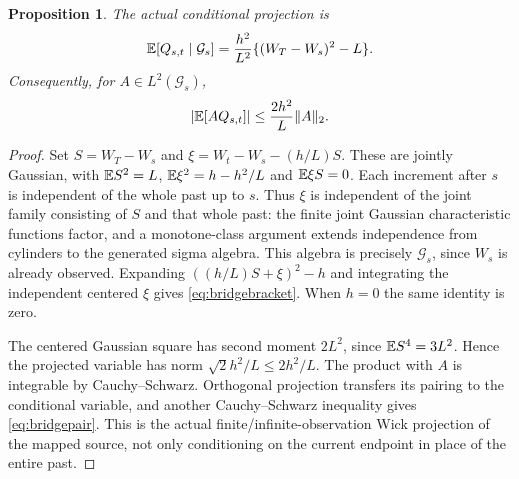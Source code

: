 \documentclass[11pt]{article}
\newtheorem{proposition}[theorem]{Proposition}
\begin{document}
\begin{proposition}\label{prop:bridgebracket}
The actual conditional projection is
\begin{equation}\label{eq:bridgebracket}
 \mathbb E[Q_{s,t}\mid\mathcal G_s]
 =\frac{h^2}{L^2}\{(W_T-W_s)^2-L\}.
\end{equation}
Consequently, for $A\in L^2(\mathcal G_s)$,
\begin{equation}\label{eq:bridgepair}
 |\mathbb E[AQ_{s,t}]|\le \frac{2h^2}{L}\|A\|_2.
\end{equation}
\end{proposition}
\begin{proof}
Set $S=W_T-W_s$ and
$\xi=W_t-W_s-(h/L)S$. These are jointly Gaussian, with
$\mathbb E S^2=L$, $\mathbb E\xi^2=h-h^2/L$ and $\mathbb E\xi S=0$.
Each increment after $s$ is independent of the whole past up to $s$.
Thus $\xi$ is independent of the joint family consisting of $S$ and that
whole past: the finite joint Gaussian characteristic functions factor,
and a monotone-class argument extends independence from cylinders to
the generated sigma algebra. This algebra is precisely $\mathcal G_s$,
since $W_s$ is already observed. Expanding
$((h/L)S+\xi)^2-h$ and integrating the independent centered $\xi$ gives
\eqref{eq:bridgebracket}. When $h=0$ the same identity is zero.

The centered Gaussian square has second moment $2L^2$, since
$\mathbb E S^4=3L^2$. Hence the projected variable has norm
$\sqrt2 h^2/L\le2h^2/L$. The product with $A$ is integrable by
Cauchy--Schwarz. Orthogonal projection transfers its pairing to the
conditional variable, and another Cauchy--Schwarz inequality gives
\eqref{eq:bridgepair}. This is the actual finite/infinite-observation
Wick projection of the mapped source, not only conditioning on the
current endpoint in place of the entire past.
\end{proof}
\end{document}
